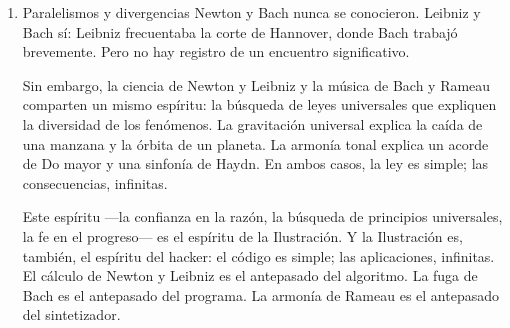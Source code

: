 \documentclass[14pt, a4paper]{article}
\begin{document}
\begin{enumerate}
El piano forte no era solo un instrumento: era una ontología. Permitía
pensar la música como un continuo de intensidades, no como una
sucesión de notas discretas. El \textbf{cromatofonismo} —el eje Z del volumen
tridimensional de Chuliá— encontraba en el piano forte su tecnología
más perfecta.

Bach probó los primeros pianos forte hacia el final de su vida. No le
gustaron: prefería el clavecín y el órgano. Rameau tampoco los usó
mucho. Pero Mozart, Haydn y Beethoven crecerían con el piano forte
como herramienta principal. La tecnología precede al pensamiento: el
piano forte hizo posible la música del Clasicismo y del Romanticismo.
\item Paralelismos y divergencias
\label{paralelismos-siglo-xviii}
Newton y Bach nunca se conocieron. Leibniz y Bach sí: Leibniz
frecuentaba la corte de Hannover, donde Bach trabajó brevemente. Pero
no hay registro de un encuentro significativo.

Sin embargo, la ciencia de Newton y Leibniz y la música de Bach y
Rameau comparten un mismo espíritu: la búsqueda de leyes universales
que expliquen la diversidad de los fenómenos. La gravitación universal
explica la caída de una manzana y la órbita de un planeta. La armonía
tonal explica un acorde de Do mayor y una sinfonía de Haydn. En ambos
casos, la ley es simple; las consecuencias, infinitas.

Este espíritu —la confianza en la razón, la búsqueda de principios
universales, la fe en el progreso— es el espíritu de la Ilustración.
Y la Ilustración es, también, el espíritu del hacker: el código es
simple; las aplicaciones, infinitas. El cálculo de Newton y Leibniz es
el antepasado del algoritmo. La fuga de Bach es el antepasado del
programa. La armonía de Rameau es el antepasado del sintetizador.
\end{enumerate}
\end{document}
